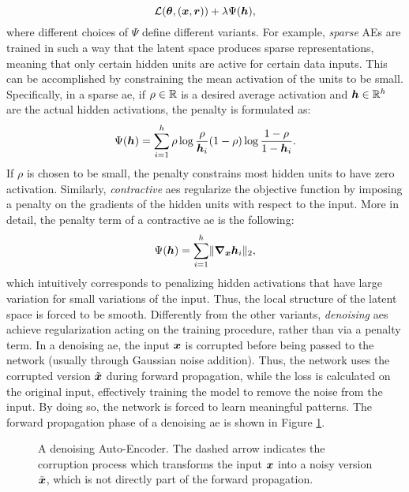 $$\Loss(\Param, (\Vector{x}, \Vector{r})) + \lambda \Psi(\Vector{h}),$$
where different choices of $\Psi$ define different variants. For example, \emph{sparse} AEs
are trained in such a way that the latent space produces sparse representations, meaning that only certain hidden units are active for certain data inputs. This can be accomplished by constraining the mean activation of the units to be small. Specifically, in a sparse \gls{ae}, if $\rho \in \mathbb{R}$ is a desired average activation and $\Vector{h} \in \Real^h$ are the actual hidden activations, the penalty is formulated as:
$$\Psi(\Vector{h}) = \sum_{i=1}^h \rho \log \frac{\rho}{\Vector{h}_i} (1 - \rho) \log \frac{1-\rho}{1-\Vector{h}_i}.$$
If $\rho$ is chosen to be small, the penalty constrains most hidden units to have zero activation. Similarly, \emph{contractive} \glspl{ae} \citep{rifai2011contractiveautoenc} regularize the objective function by imposing a penalty on the gradients of the hidden units with respect to the input. More in detail, the penalty term of a contractive \gls{ae} is the following:
$$\Psi(\Vector{h}) = \sum_{i=1}^h\norm{\grad_{\Vector{x}}\Vector{h}_i}_2,$$
which intuitively corresponds to penalizing hidden activations that have large variation for small variations of the input. Thus, the local structure of the latent space is forced to be smooth. Differently from the other variants, \emph{denoising} \glspl{ae} \citep{vincent2010denoisingautoenc} achieve regularization acting on the training procedure, rather than via a penalty term. In a denoising \gls{ae}, the input $\Vector{x}$ is corrupted before being passed to the network (usually through Gaussian noise addition). Thus, the network uses the corrupted version $\tilde{\Vector{x}}$ during forward propagation, while the loss is calculated on the original input, effectively training the model to remove the noise from the input. By doing so, the network is forced to learn meaningful patterns. The forward propagation phase of a denoising \gls{ae} is shown in Figure \ref{fig:denoising-ae}.
\begin{figure*}[h!]
    \centering
    \resizebox{.6\textwidth}{!}{}
    \caption{A denoising Auto-Encoder. The dashed arrow indicates the corruption process which transforms the input $\Vector{x}$ into a noisy version $\tilde{\Vector{x}}$, which is not directly part of the forward propagation.}
    \label{fig:denoising-ae}
\end{figure*}

